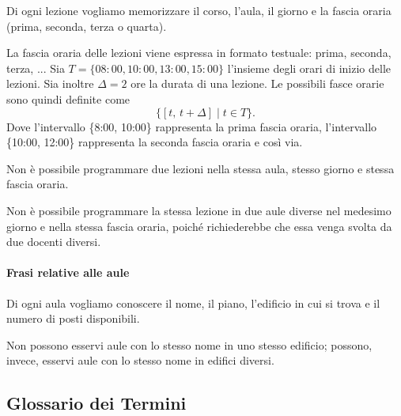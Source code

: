 \documentclass[a4paper,11pt]{article}
\begin{document}
Di ogni lezione vogliamo memorizzare il corso, l'aula, il giorno e la fascia oraria (prima, seconda, terza o quarta).

La fascia oraria delle lezioni viene espressa in formato testuale: prima, seconda, terza, ...
Sia $ T = \{08{:}00, 10{:}00, 13{:}00, 15{:}00\}$ l'insieme degli orari di inizio delle lezioni.
Sia inoltre $\Delta = 2 \text{ ore}$ la durata di una lezione.
Le possibili fasce orarie sono quindi definite come
$$
\{[t,\, t+\Delta] \mid t \in T\}.
$$
Dove l'intervallo \{8:00, 10:00\} rappresenta la prima fascia oraria, l'intervallo \{10:00, 12:00\} rappresenta la seconda fascia oraria e così via.

Non è possibile programmare due lezioni nella stessa aula, stesso giorno e stessa fascia oraria.

Non è possibile programmare la stessa lezione in due aule diverse nel medesimo giorno e nella stessa fascia oraria, poiché richiederebbe che essa venga svolta da due docenti diversi.


\paragraph{Frasi relative alle aule}

Di ogni aula vogliamo conoscere il nome, il piano, l'edificio in cui si trova e il numero di posti disponibili.

Non possono esservi aule con lo stesso nome in uno stesso edificio; possono, invece, esservi aule con lo stesso nome in edifici diversi.

\subsection{Glossario dei Termini}
\end{document}
